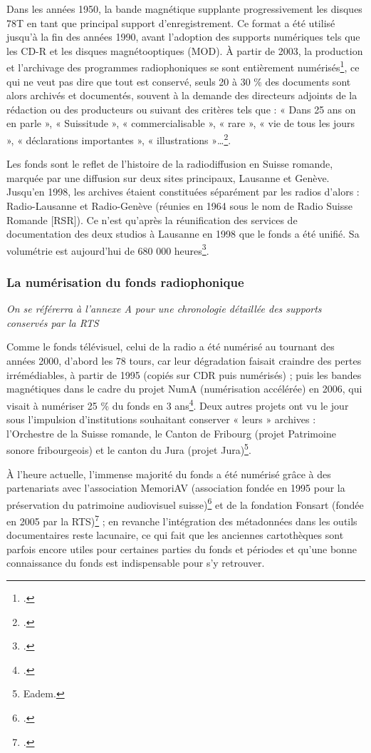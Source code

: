 Dans les années 1950, la bande magnétique supplante progressivement les disques 78T en tant que principal support d’enregistrement. Ce format a été utilisé jusqu’à la fin des années 1990, avant l’adoption des supports numériques tels que les CD-R et les disques magnétooptiques (MOD). À partir de 2003, la production et l’archivage des programmes radiophoniques se sont entièrement numérisés\footcite[p. 27]{prongue2009}, ce qui ne veut pas dire que tout est conservé, seuls 20 à 30 \% des documents sont alors archivés et documentés, souvent à la demande des directeurs adjoints de la rédaction ou des producteurs ou suivant des critères tels que : « Dans 25 ans on en parle », « Suissitude », « commercialisable », « rare », « vie de tous les jours », « déclarations importantes », « illustrations »…\footcite{meuret2024}.

Les fonds sont le reflet de l’histoire de la radiodiffusion en Suisse romande, marquée par une diffusion sur deux sites principaux, Lausanne et Genève. Jusqu’en 1998, les archives étaient constituées séparément par les radios d’alors : Radio-Lausanne et Radio-Genève (réunies en 1964 sous le nom de Radio Suisse Romande [RSR]). Ce n’est qu’après la réunification des services de documentation des deux studios à Lausanne en 1998 que le fonds a été unifié. Sa volumétrie est aujourd’hui de 680 000 heures\footcite{sonderegger2024}.

\subsubsection{La numérisation du fonds radiophonique}
\textit{On se référerra à l'annexe A pour une chronologie détaillée des supports conservés par la RTS}

Comme le fonds télévisuel, celui de la radio a été numérisé au tournant des années 2000, d’abord les 78 tours, car leur dégradation faisait craindre des pertes irrémédiables, à partir de 1995 (copiés sur CDR puis numérisés) ; puis les bandes magnétiques dans le cadre du projet NumA (numérisation accélérée) en 2006, qui visait à numériser 25 \% du fonds en 3 ans\footcite[p. 20]{prongue2009}. Deux autres projets ont vu le jour sous l’impulsion d’institutions souhaitant conserver « leurs » archives : l’Orchestre de la Suisse romande, le Canton de Fribourg (projet Patrimoine sonore fribourgeois) et le canton du Jura (projet Jura)\footnote{Eadem.}.

À l’heure actuelle, l’immense majorité du fonds a été numérisé grâce à des partenariats avec l’association MemoriAV (association fondée en 1995 pour la préservation du patrimoine audiovisuel suisse)\footcite{zotero-254} et de la fondation Fonsart (fondée en 2005 par la RTS)\footcite{freudiguer2024} ; en revanche l’intégration des métadonnées dans les outils documentaires reste lacunaire, ce qui fait que les anciennes cartothèques sont parfois encore utiles pour certaines parties du fonds et périodes et qu’une bonne connaissance du fonds est indispensable pour s’y retrouver.


